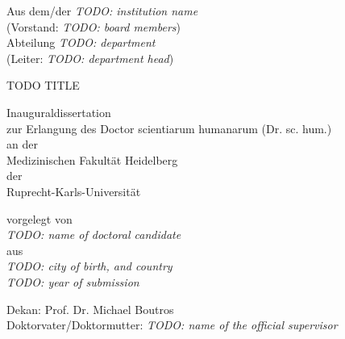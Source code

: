 \begin{center}

    Aus dem/der \textit{TODO: institution name} \\

    (Vorstand: \textit{TODO: board members}) \\
    Abteilung \textit{TODO: department} \\
    (Leiter: \textit{TODO: department head})

    \vfill
    
    {\Huge \scshape {TODO TITLE \par}} %


    \vfill

    Inauguraldissertation \\
    zur Erlangung des Doctor scientiarum humanarum (Dr. sc. hum.) \\
    an der \\
    Medizinischen Fakultät Heidelberg \\
    der \\
    Ruprecht-Karls-Universität 

    \vfill

    vorgelegt von \\
    \textit{TODO: name of doctoral candidate} \\
    aus \\
    \textit{TODO: city of birth, and country} \\
    \bigskip
    \textit{TODO: year of submission}

\end{center}

\newpage
\null\newpage
\vspace*{\fill}
 
\noindent Dekan: Prof. Dr. Michael Boutros \\
Doktorvater/Doktormutter: \textit{TODO: name of the official supervisor} 

\newpage
\null\newpage